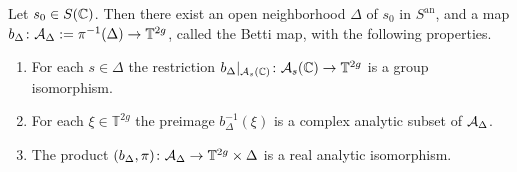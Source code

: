 \begin{proposition}\label{PropBettiMapApp}
Let $s_0 \in S({\mathbb{C}})$. Then there exist an open neighborhood $\Delta$ of $s_0$ in $S^{\mathrm{an}}$, and a map $b_{\Delta} \colon \mathcal{A}_{\Delta} := \pi^{-1}(\Delta) \rightarrow \mathbb T^{2g}$, called the Betti map, with the following properties.
\begin{enumerate}
\item[(i)] For each $s \in \Delta$ the restriction $b_{\Delta}|_{\mathcal{A}_s({\mathbb{C}})} \colon \mathcal{A}_s({\mathbb{C}}) \rightarrow \mathbb T^{2g}$ is a group isomorphism.
\item[(ii)] For each $\xi \in \mathbb T^{2g}$ the preimage $b_{\Delta}^{-1}(\xi)$ is a complex analytic subset of $\mathcal{A}_{\Delta}$.
\item[(iii)] The product
$(b_{\Delta},\pi) \colon \mathcal{A}_{\Delta} \rightarrow \mathbb
T^{2g} \times \Delta$ is a real analytic isomorphism.%
\end{enumerate}
\end{proposition}

